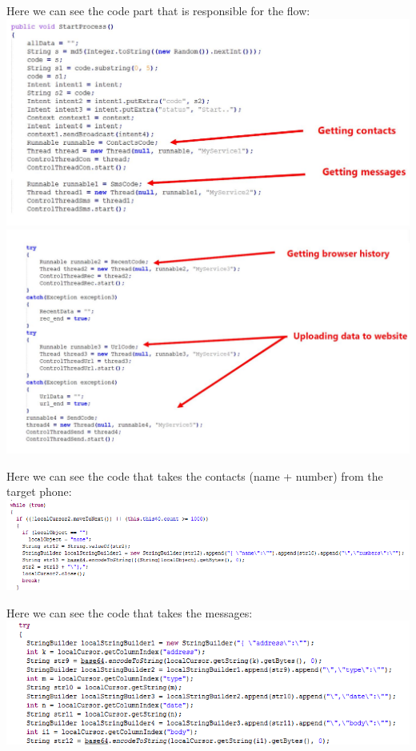 \parbox{\textwidth}{
Here we can see the code part that is responsible for the flow: \\
\includegraphics[width=\textwidth]{figs/gone60_6.JPG} \\
\includegraphics[width=\textwidth]{figs/gone60_6_2.JPG}
}

\parbox{\textwidth}{
Here we can see the code that takes the contacts (name + number) from the target phone: \\
\includegraphics[width=\textwidth]{figs/gone60_7.png}
}

\parbox{\textwidth}{
Here we can see the code that takes the messages: \\
\includegraphics[width=\textwidth]{figs/gone60_8.png}
}

